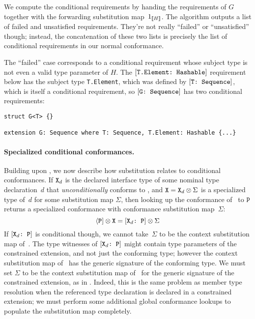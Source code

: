 \documentclass[../generics]{subfiles}
\begin{document}
We compute the conditional requirements by handing  the requirements of $G$ together with the forwarding substitution map~$1_{[\![H]\!]}$. The algorithm outputs a list of failed and unsatisfied requirements. They're not really ``failed'' or ``unsatisfied'' though; instead, the concatenation of these two lists is precisely the list of conditional requirements in our normal conformance.

The ``failed'' case corresponds to a conditional requirement whose subject type is not even a valid type parameter of $H$. The $[\texttt{T.Element:~Hashable}]$ requirement below has the subject type \texttt{T.Element}, which was defined by $[\texttt{T:~Sequence}]$, which is itself a conditional requirement, so $[\texttt{G:~Sequence}]$ has two conditional requirements:
\begin{Verbatim}
struct G<T> {}

extension G: Sequence where T: Sequence, T.Element: Hashable {...}
\end{Verbatim}
\paragraph{Specialized conditional conformances.} Building upon , we now describe how substitution relates to conditional conformances. If $\texttt{X}_d$ is the declared interface type of some nominal type declaration~$d$ that \emph{unconditionally} conforms to \tP, and $\texttt{X} = \texttt{X}_d \otimes \Sigma$ is a specialized type of~$d$ for some substitution map $\Sigma$, then looking up the conformance of \tX\ to $\texttt{P}$ returns a specialized conformance with conformance substitution map~$\Sigma$:
\[\langle\texttt{P}]\otimes\texttt{X}=[\texttt{$\texttt{X}_d$:~P}]\otimes\Sigma\]
If $[\texttt{$\texttt{X}_d$:~P}]$ is conditional though, we cannot take~$\Sigma$ to be the context substitution map of~\tX. The type witnesses of $[\texttt{$\texttt{X}_d$:~P}]$ might contain type parameters of the constrained extension, and not just the conforming type; however the context substitution map of \tX\ has the generic signature of the conforming type. We must set $\Sigma$ to be the context substitution map of \tX\ for the generic signature of the constrained extension, as in . Indeed, this is the same problem as member type resolution when the referenced type declaration is declared in a constrained extension; we must perform some additional global conformance lookups to populate the substitution map completely.
\end{document}
